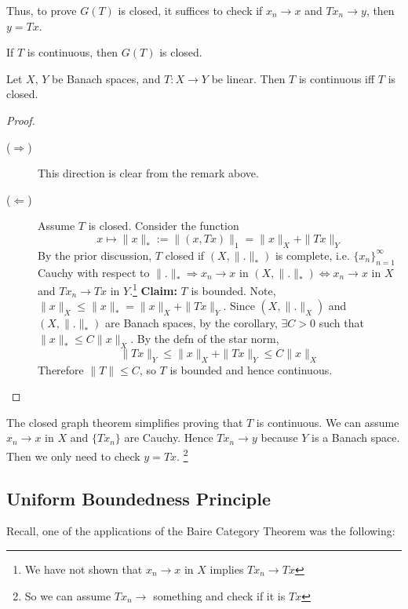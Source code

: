 \noindent Thus, to prove $G(T)$ is closed, it suffices to check if $x_n \to x$ and $Tx_n \to y$, 
then $y = Tx$.    

\begin{rem}
    If $T$ is continuous, then $G(T)$ is closed.  
\end{rem}

\begin{thm}
    Let $X$, $Y$ be Banach spaces, and $T : X \to Y$ be linear. Then $T$ is continuous iff $T$ is closed.    
\end{thm}
\begin{proof} \leavevmode
    \begin{description}
        \item[($\Rightarrow$)] This direction is clear from the remark above.
        \item[($\Leftarrow$)] Assume $T$ is closed. Consider the function 
        \[
        x \mapsto \| x \|_* := \| (x, Tx) \|_1 = \| x \|_X + \| Tx \|_Y 
        \]  
        By the prior discussion, $T$ closed if $(X, \| . \|_*)$ is complete, i.e. $\{x_{n}\}_{n=1}^{\infty}$
        Cauchy with respect to $\| . \|_* \Rightarrow x_n \to x$ in $(X, \| . \|_*) \iff
        x_n \to x$ in $X$ and $Tx_n \to Tx$ in $Y$.\footnote{We have not shown that $x_n \to x$ in $X$ 
        implies $T x_n \to Tx$} 
        \newline\noindent \textbf{Claim:} $T$ is bounded.
        \newline\noindent Note, $\| x \|_X \leq \| x \|_* = \| x \|_X + \| Tx \|_Y $. Since
        $(X, \| . \|_X )$ and $(X, \| . \|_* )$ are Banach spaces, by the corollary, $\exists C > 0$
        such that $\| x \|_* \leq C \| x \|_X  $. By the defn of the star norm,
        \[
            \| Tx \|_Y \leq \| x \|_X + \| Tx \|_Y \leq C \| x \|_X    
        \]         
        Therefore $\| T \| \leq C $, so $T$ is bounded and hence continuous. \qedhere  
    \end{description} 
\end{proof}

\begin{rem}
    The closed graph theorem simplifies proving that $T$ is continuous. We can assume
    $x_n \to x$ in $X$ and $\{ Tx_n \}$ are Cauchy. Hence $T x_n \to y$ because $Y$ is a 
    Banach space. Then we only need to check $y = Tx$. \footnote{So we can assume $T x_n \to$ something
    and check if it is $Tx$}
\end{rem}

\subsection{Uniform Boundedness Principle}
Recall, one of the applications of the Baire Category Theorem was the following:

